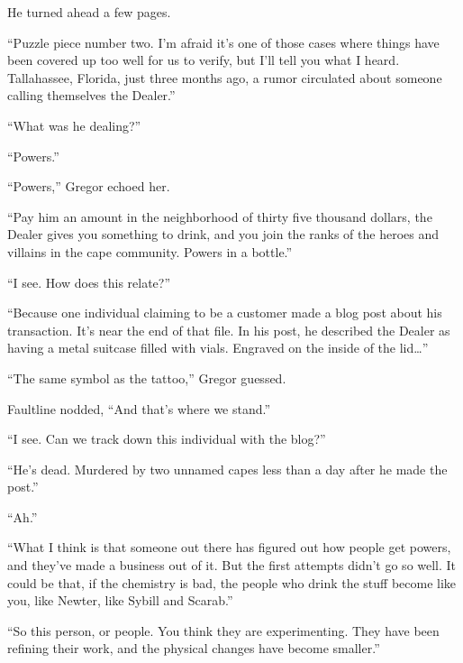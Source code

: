 He turned ahead a few pages.



``Puzzle piece number two.  I'm afraid it's one of those cases where things have been covered up too well for us to verify, but I'll tell you what I heard.  Tallahassee, Florida, just three months ago, a rumor circulated about someone calling themselves the Dealer.''



``What was he dealing?''



``Powers.''



``Powers,'' Gregor echoed her.



``Pay him an amount in the neighborhood of thirty five thousand dollars, the Dealer gives you something to drink, and you join the ranks of the heroes and villains in the cape community.  Powers in a bottle.''



``I see.  How does this relate?''



``Because one individual claiming to be a customer made a blog post about his transaction.  It's near the end of that file.  In his post, he described the Dealer as having a metal suitcase filled with vials. Engraved on the inside of the lid\ldots''



``The same symbol as the tattoo,'' Gregor guessed.



Faultline nodded, ``And that's where we stand.''



``I see.  Can we track down this individual with the blog?''



``He's dead.  Murdered by two unnamed capes less than a day after he made the post.''



``Ah.''



``What I think is that someone out there has figured out how people get powers, and they've made a business out of it.  But the first attempts didn't go so well.  It could be that, if the chemistry is bad, the people who drink the stuff become like you, like Newter, like Sybill and Scarab.''



``So this person, or people.  You think they are experimenting.  They have been refining their work, and the physical changes have become smaller.''



